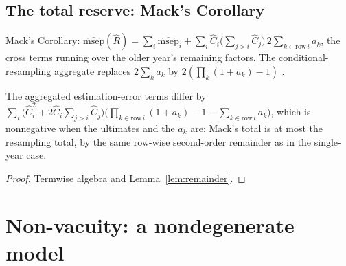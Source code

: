 \section{The total reserve: Mack's Corollary}

\begin{definition}\label{def:total}\leanok
{}
Mack's Corollary: $\widehat{\mathrm{msep}}(\hat R) = \sum_i \widehat{\mathrm{msep}}_i + \sum_i \hat C_i \big(\sum_{j>i}\hat C_j\big)\, 2\sum_{k \in \mathrm{row}\,i} a_k$,
the cross terms running over the older year's remaining factors. The conditional-resampling
aggregate replaces $2\sum_k a_k$ by $2(\prod_k (1+a_k) - 1)$
\cite[Section 4.3]{BBMW2006}.
\end{definition}

\begin{theorem}\label{thm:total}\leanok
{}
The aggregated estimation-error terms differ by
$\sum_i \big(\hat C_i^2 + 2\hat C_i \sum_{j>i}\hat C_j\big)\big(\prod_{k \in \mathrm{row}\,i}(1+a_k) - 1 - \sum_{k \in \mathrm{row}\,i} a_k\big)$,
which is nonnegative when the ultimates and the $a_k$ are: Mack's total is at most the
resampling total, by the same row-wise second-order remainder as in the single-year case.
\end{theorem}
\begin{proof}\leanok Termwise algebra and Lemma~\ref{lem:remainder}. \end{proof}

























\chapter{Non-vacuity: a nondegenerate model}

